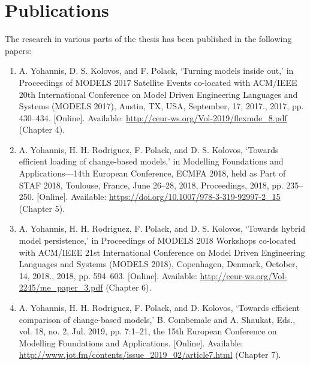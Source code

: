 \section{Publications}
\label{sec:publications}
The research in various parts of the thesis has been published in the following papers:
\begin{enumerate}
  \item A. Yohannis, D. S. Kolovos, and F. Polack, ‘Turning models inside out,’ in Proceedings of MODELS 2017 Satellite Events co-located with ACM/IEEE 20th International Conference on Model Driven Engineering Languages and Systems (MODELS 2017), Austin, TX, USA, September, 17, 2017., 2017, pp. 430–434. [Online]. Available: \url{http://ceur-ws.org/Vol-2019/flexmde_8.pdf} (Chapter 4).
  
  \item A. Yohannis, H. H. Rodriguez, F. Polack, and D. S. Kolovos, ‘Towards efficient loading of change-based models,’ in Modelling Foundations and Applications—14th European Conference, ECMFA 2018, held as Part of STAF 2018, Toulouse, France, June 26–28, 2018, Proceedings, 2018, pp. 235–250. [Online]. Available: \url{https://doi.org/10.1007/978-3-319-92997-2_15} (Chapter 5).
  
  \item A. Yohannis, H. H. Rodriguez, F. Polack, and D. S. Kolovos, ‘Towards hybrid model persistence,’ in Proceedings of MODELS 2018 Workshops co-located with ACM/IEEE 21st International Conference on Model Driven Engineering Languages and Systems (MODELS 2018), Copenhagen, Denmark, October, 14, 2018., 2018, pp. 594–603. [Online]. Available: \url{http://ceur-ws.org/Vol-2245/me_paper_3.pdf} (Chapter 6).
  
  \item A. Yohannis, H. H. Rodriguez, F. Polack, and D. Kolovos, ‘Towards efficient comparison of change-based models,’ B. Combemale and A. Shaukat, Eds., vol. 18, no. 2, Jul. 2019, pp. 7:1–21, the 15th European Conference on Modelling Foundations and Applications. [Online]. Available:
  \url{http://www.jot.fm/contents/issue_2019_02/article7.html} (Chapter 7).
\end{enumerate}
